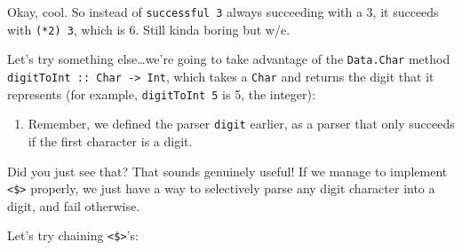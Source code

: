 \documentclass[]{article}
\newenvironment{Shaded}{}{}
\newcommand{\CommentTok}[1]{\textcolor[rgb]{0.38,0.63,0.69}{\textit{#1}}}
\newcommand{\DataTypeTok}[1]{\textcolor[rgb]{0.56,0.13,0.00}{#1}}
\newcommand{\DecValTok}[1]{\textcolor[rgb]{0.25,0.63,0.44}{#1}}
\newcommand{\FunctionTok}[1]{\textcolor[rgb]{0.02,0.16,0.49}{#1}}
\newcommand{\KeywordTok}[1]{\textcolor[rgb]{0.00,0.44,0.13}{\textbf{#1}}}
\newcommand{\NormalTok}[1]{#1}
\newcommand{\OperatorTok}[1]{\textcolor[rgb]{0.40,0.40,0.40}{#1}}
\newcommand{\OtherTok}[1]{\textcolor[rgb]{0.00,0.44,0.13}{#1}}
\newcommand{\StringTok}[1]{\textcolor[rgb]{0.25,0.44,0.63}{#1}}
\begin{document}
Okay, cool. So instead of \texttt{successful\ 3} always succeeding with a 3, it
succeeds with \texttt{(*2)\ 3}, which is 6. Still kinda boring but w/e.

Let's try something else\ldots we're going to take advantage of the
\texttt{Data.Char} method \texttt{digitToInt\ ::\ Char\ -\textgreater{}\ Int},
which takes a \texttt{Char} and returns the digit that it represents (for
example, \texttt{digitToInt\ \textquotesingle{}5\textquotesingle{}} is 5, the
integer):

\begin{Shaded}
\end{Shaded}

\begin{enumerate}
\def\labelenumi{\arabic{enumi}.}
\tightlist
\item
  Remember, we defined the parser \texttt{digit} earlier, as a parser that only
  succeeds if the first character is a digit.
\end{enumerate}

Did you just see that? That sounds genuinely useful! If we manage to implement
\texttt{\textless{}\$\textgreater{}} properly, we just have a way to selectively
parse any digit character into a digit, and fail otherwise.

Let's try chaining \texttt{\textless{}\$\textgreater{}}'s:

\begin{Shaded}
\end{Shaded}
\end{document}
